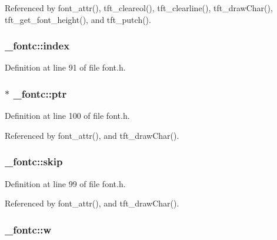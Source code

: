 Referenced by font\+\_\+attr(), tft\+\_\+cleareol(), tft\+\_\+clearline(), tft\+\_\+draw\+Char(), tft\+\_\+get\+\_\+font\+\_\+height(), and tft\+\_\+putch().

\subsubsection[{\texorpdfstring{index}{index}}]{ \+\_\+fontc\+::index}\hypertarget{struct__fontc_a7cc0370744ff7ea964054d36917c9a2f}{}\label{struct__fontc_a7cc0370744ff7ea964054d36917c9a2f}


Definition at line 91 of file font.\+h.

\subsubsection[{\texorpdfstring{ptr}{ptr}}]{ $\ast$ \+\_\+fontc\+::ptr}\hypertarget{struct__fontc_a60a3fef5ccd80dff543aac3f22f74876}{}\label{struct__fontc_a60a3fef5ccd80dff543aac3f22f74876}


Definition at line 100 of file font.\+h.



Referenced by font\+\_\+attr(), and tft\+\_\+draw\+Char().

\subsubsection[{\texorpdfstring{skip}{skip}}]{ \+\_\+fontc\+::skip}\hypertarget{struct__fontc_a44c94e91afa006cb2ffe55a99b3e2d3c}{}\label{struct__fontc_a44c94e91afa006cb2ffe55a99b3e2d3c}


Definition at line 99 of file font.\+h.



Referenced by font\+\_\+attr(), and tft\+\_\+draw\+Char().

\subsubsection[{\texorpdfstring{w}{w}}]{ \+\_\+fontc\+::w}\hypertarget{struct__fontc_a9c2af0354d2b2009e7b6684e25fd479b}{}\label{struct__fontc_a9c2af0354d2b2009e7b6684e25fd479b}



